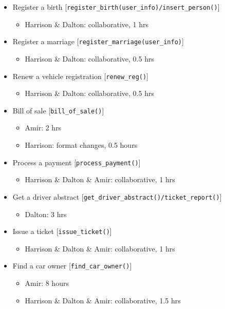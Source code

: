 \documentclass[10pt, a4paper]{article}
\begin{document}
{\begin{itemize}
	\item Register a birth [\texttt{register\_birth(user\_info)/insert\_person()}]
		\begin{itemize}
		\item Harrison \& Dalton: collaborative, 1 hrs
		\end{itemize}
	
	\item Register a marriage [\texttt{register\_marriage(user\_info)}]
		\begin{itemize}
		\item Harrison \& Dalton: collaborative, 0.5 hrs
		\end{itemize}

	\item Renew a vehicle registration [\texttt{renew\_reg()}]
		\begin{itemize}
		\item Harrison \& Dalton: collaborative, 0.5 hrs
		\end{itemize}
		
	\item Bill of sale [\texttt{bill\_of\_sale()}]
		\begin{itemize}
		\item Amir: 2 hrs
		\item Harrison: format changes, 0.5 hours
		\end{itemize}
		
	\item Process a payment [\texttt{process\_payment()}]
		\begin{itemize}
		\item Harrison \& Dalton \& Amir: collaborative, 1 hrs
		\end{itemize}
		
	\item Get a driver abstract [\texttt{get\_driver\_abstract()/ticket\_report()}]
		\begin{itemize}
		\item Dalton: 3 hrs
		\end{itemize}
		
	\item Issue a ticket [\texttt{issue\_ticket()}]
		\begin{itemize}
		\item Harrison \& Dalton \& Amir: collaborative, 1 hrs
		\end{itemize}
		
	\item Find a car owner [\texttt{find\_car\_owner()}]
		\begin{itemize}
		\item Amir: 8 hours
		\item Harrison \& Dalton \& Amir: collaborative, 1.5 hrs
		\end{itemize}
	

\end{itemize}}
\end{document}
